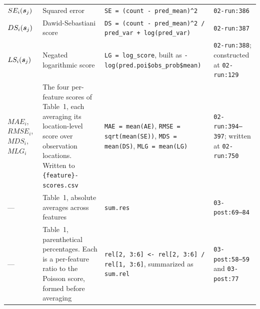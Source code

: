 \documentclass[10pt]{article}
\newcommand{\bs}{\mbox{\boldmath $s$}}
\begin{document}
\begin{longtable}{@{}L{2.6cm} L{5.6cm} L{6.6cm} L{4.4cm}@{}}
$SE_i(\bs_j)$ & Squared error & \texttt{SE = (count - pred\_mean)\^{}2} & \texttt{02-run:386} \\[3pt]

$DS_i(\bs_j)$ & Dawid-Sebastiani score & \texttt{DS = (count - pred\_mean)\^{}2 / pred\_var + log(pred\_var)} & \texttt{02-run:387} \\[3pt]

$LS_i(\bs_j)$ & Negated logarithmic score & \texttt{LG = log\_score}, built as \texttt{-log(pred.poi\$obs\_prob\$mean)} & \texttt{02-run:388}; constructed at \texttt{02-run:129} \\[3pt]

$MAE_i$, $RMSE_i$, $MDS_i$, $MLG_i$ & The four per-feature scores of Table~1, each averaging its location-level score over observation locations. Written to \texttt{\{feature\}-scores.csv} & \texttt{MAE = mean(AE)}, \texttt{RMSE = sqrt(mean(SE))}, \texttt{MDS = mean(DS)}, \texttt{MLG = mean(LG)} & \texttt{02-run:394--397}; written at \texttt{02-run:750} \\[3pt]

--- & Table~1, absolute averages across features & \texttt{sum.res} & \texttt{03-post:69--84} \\[3pt]

--- & Table~1, parenthetical percentages. Each is a per-feature ratio to the Poisson score, formed before averaging & \texttt{rel[2, 3:6] <- rel[2, 3:6] / rel[1, 3:6]}, summarized as \texttt{sum.rel} & \texttt{03-post:58--59} and \texttt{03-post:77} \\

\end{longtable}
\end{document}
